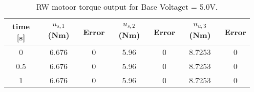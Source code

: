 \begin{table}[htbp]\caption{RW motoor torque output for Base Voltaget = 5.0V.}\label{tbl:baseVoltage5.0}\centering\begin{tabular}{ccccccc}
\hline
  time [s]  &  $u_{s,1}$ (Nm)  &  Error  &  $u_{s,2}$ (Nm)  &  Error  &  $u_{u,3}$ (Nm)  &  Error  \\
\hline
     0      &      6.676       &    0    &       5.96       &    0    &      8.7253      &    0    \\
    0.5     &      6.676       &    0    &       5.96       &    0    &      8.7253      &    0    \\
     1      &      6.676       &    0    &       5.96       &    0    &      8.7253      &    0    \\
\hline\end{tabular}\end{table}